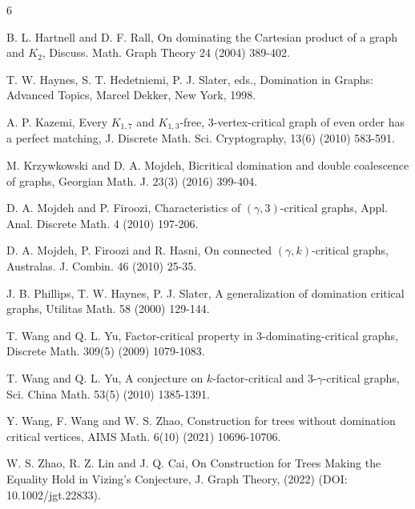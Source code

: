 \documentclass[a4paper,11pt]{article}
\numberwithin{equation}{section}
\begin{document}
\begin{thebibliography}{6}
{ B. L. Hartnell and D. F. Rall, On dominating the Cartesian product of a graph and $K_2$, Discuss. Math. Graph Theory 24 (2004) 389-402.

 T. W. Haynes, S. T. Hedetniemi, P. J. Slater, eds., Domination in Graphs: Advanced Topics, Marcel Dekker, New York, 1998.

 A. P. Kazemi, Every $K_{1,7}$ and $K_{1,3}$-free, 3-vertex-critical graph of even order has a perfect matching, J. Discrete Math. Sci. Cryptography, 13(6) (2010) 583-591.

 M. Krzywkowski and D. A. Mojdeh, Bicritical domination and double coalescence of graphs, Georgian Math. J.  23(3) (2016) 399-404.

 D. A. Mojdeh and P. Firoozi, Characteristics of $(\gamma,3)$-critical graphs, Appl. Anal. Discrete Math. 4 (2010) 197-206.

 D. A. Mojdeh, P. Firoozi and R. Hasni,  On connected $(\gamma,k)$-critical graphs,  Australas. J. Combin. 46 (2010) 25-35.

 J. B. Phillips, T. W. Haynes, P. J. Slater, A generalization of domination critical graphs, Utilitas Math. 58 (2000) 129-144.



 T. Wang and Q. L. Yu, Factor-critical property in $3$-dominating-critical graphs, Discrete Math. 309(5) (2009) 1079-1083.

 T. Wang and Q. L. Yu, A conjecture on $k$-factor-critical and $3$-$\gamma$-critical graphs, Sci. China Math. 53(5) (2010) 1385-1391.

 Y. Wang, F. Wang and W. S. Zhao, Construction for trees without domination critical vertices, AIMS Math. 6(10) (2021)  10696-10706.

 W. S. Zhao, R. Z. Lin and  J. Q. Cai,  On Construction for Trees Making the Equality Hold in Vizing's Conjecture, J. Graph Theory, (2022) (DOI: 10.1002/jgt.22833).
}
\end{thebibliography}
\end{document}
